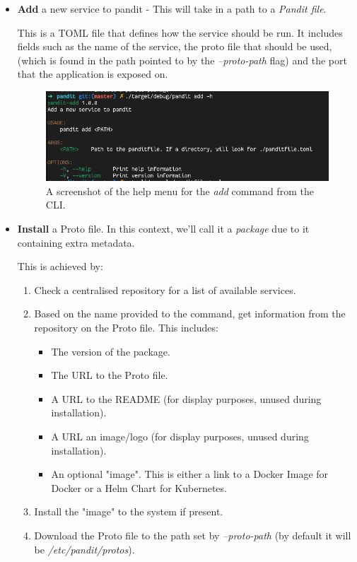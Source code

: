\documentclass[a4paper,12pt]{report}
\begin{document}
\begin{itemize}
    \item \textbf{Add} a new service to pandit - This will take in a path to a \textit{Pandit file}.
    
    This is a TOML file that defines how the service should be run. It includes fields such as the name of the service, the proto file that should be used, (which is found in the path pointed to by the \textit{--proto-path} flag) and the port that the application is exposed on.
    
    \begin{figure}[hbt!]
        \centering
        \includegraphics[width=\linewidth]{cli2.png}
        \caption{A screenshot of the help menu for the \textit{add} command from the CLI.}
        \label{fig:admin}
    \end{figure}
    \newpage
    
    \item \textbf{Install} a Proto file. In this context, we'll call it a \textit{package} due to it containing extra metadata.
    
    This is achieved by:
    
    \begin{enumerate}
        \item Check a centralised repository for a list of available services.
        \item Based on the name provided to the command, get information from the repository on the Proto file. This includes:
        \begin{itemize}
            \item The version of the package.
            \item The URL to the Proto file.
            \item A URL to the README (for display purposes, unused during installation).
            \item A URL an image/logo (for display purposes, unused during installation).
            \item An optional "image". This is either a link to a Docker Image \cite{image} for Docker or a Helm Chart \cite{helm} for Kubernetes.
        \end{itemize}
        \item Install the "image" to the system if present.
        \item Download the Proto file to the path set by \textit{--proto-path} (by default it will be \textit{/etc/pandit/protos}).
    \end{enumerate}
    

\end{itemize}
\end{document}
